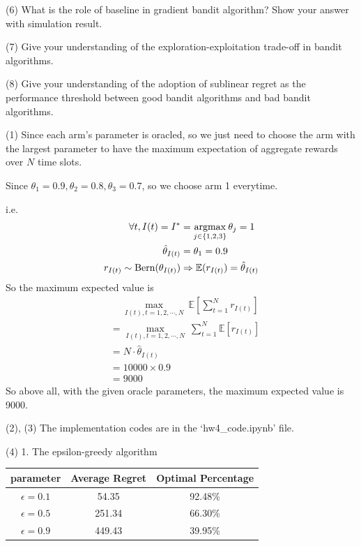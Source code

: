 \begin{itemize}
(6) What is the role of baseline in gradient bandit algorithm? Show your answer with simulation result.

(7) Give your understanding of the exploration-exploitation trade-off in bandit algorithms.

(8) Give your understanding of the adoption of sublinear regret as the performance threshold between good bandit algorithms and bad bandit algorithms.

\end{itemize}

\solution

(1) Since each arm's parameter is oracled, so we just need to choose the arm with the largest parameter to have the maximum expectation of aggregate rewards over $N$ time slots.

Since $\theta_1 = 0.9, \theta_2 = 0.8, \theta_3 = 0.7$, so we choose arm 1 everytime.

i.e.
\begin{align*}
\forall t, I(t)=I^* &= \mathop{\rm argmax}\limits_{j\in\{1,2,3\}}\theta_j=1 \\
\hat{\theta}_{I(t)} &= \theta_1 = 0.9 \\
r_{I(t)} \sim \text{Bern}(\theta_{I(t)}) &\Rightarrow \mathbb{E}(r_{I(t)}) = \hat{\theta}_{I(t)}
\end{align*}
So the maximum expected value is
\begin{align*}
&\quad\ \max_{I(t),t=1,2,\cdots,N}\ \mathbb{E}\left[\sum_{t=1}^Nr_{I(t)}\right] \\
&= \max_{I(t),t=1,2,\cdots,N}\ \sum_{t=1}^N\mathbb{E}\left[r_{I(t)}\right] \\
&= N \cdot \hat{\theta}_{I(t)} \\&= 10000 \times 0.9 \\
&= 9000
\end{align*}
So above all, with the given oracle parameters, the maximum expected value is 9000.

(2), (3) The implementation codes are in the `hw4\_code.ipynb' file.

(4) 1. The epsilon-greedy algorithm
\begin{table}[h]
    \centering
    \begin{tabular}{c c c}
    \toprule
    parameter & Average Regret & Optimal Percentage \\
    \midrule
    $\epsilon=0.1$ & 54.35  & 92.48\% \\
    $\epsilon=0.5$ & 251.34 & 66.30\% \\
    $\epsilon=0.9$ & 449.43 & 39.95\% \\
    \bottomrule
\end{tabular}
\vspace{-0.5cm}
\end{table}

